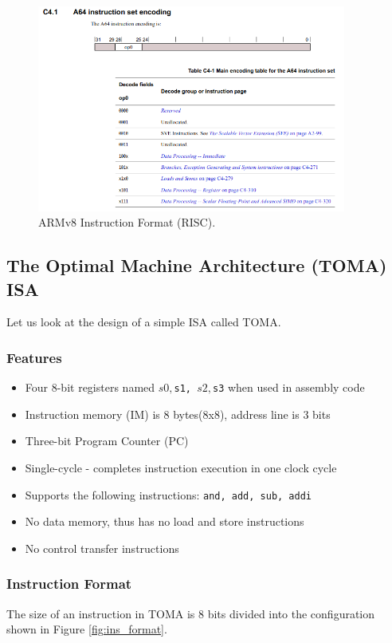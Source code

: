 \documentclass[a4paper, 11pt,oneside]{article}
\begin{document}
\begin{figure}[H]
	\begin{center}
	\includegraphics[width=4in]{armv8.png}
	\caption{ARMv8 Instruction Format (RISC).}
	\label{fig:armv8} 
	\end{center}
\end{figure}

\subsection{The Optimal Machine Architecture (TOMA) ISA}
Let us look at the design of a simple ISA called TOMA.

\subsubsection{Features}
\begin{itemize}
\item Four 8-bit registers named \texttt{$s0, $s1, $s2, $s3} when 
used in assembly code
\item Instruction memory (IM) is 8 bytes(8x8), address line is 3 bits
\item Three-bit Program Counter (PC)
\item Single-cycle - completes instruction execution in one clock cycle
\item Supports the following instructions: \texttt{and, add, sub, 
addi}
\item No data memory, thus has no load and store instructions
\item No control transfer instructions
\end{itemize}

\subsubsection{Instruction Format}
The size of an instruction in TOMA is 8 bits divided into the configuration 
shown in Figure \ref{fig:ins_format}.
\end{document}
